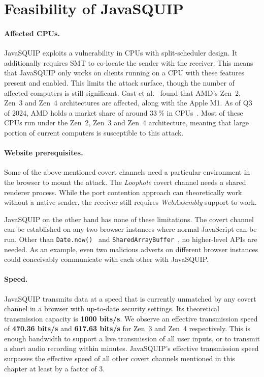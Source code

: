\documentclass[11pt,
  titlepage=false,
  parskip=half,      %
]{scrreprt}
\begin{document}
\section{Feasibility of JavaSQUIP}

\paragraph{Affected CPUs.}
JavaSQUIP exploits a vulnerability in CPUs with split-scheduler design.
It additionally requires SMT to co-locate the sender with the receiver.
This means that JavaSQUIP only works on clients running on a CPU with these features present and enabled.
This limits the attack surface, though the number of affected computers is still significant.
Gast et al.~\cite{squip} found that AMD's Zen~2, Zen~3 and Zen~4 architectures are affected, along with the Apple M1.
As of Q3 of 2024, AMD holds a market share of around $33~\%$ in CPUs~\cite{amdmarket}.
Most of these CPUs run under the Zen~2, Zen~3 and Zen~4 architecture,
meaning that large portion of current computers is susceptible to this attack.

\paragraph{Website prerequisites.}
Some of the above-mentioned covert channels need a particular environment in the browser to mount the attack.
The \textit{Loophole} covert channel needs a shared renderer process.
While the port contention approach can theoretically work without a native sender,
the receiver still requires \textit{WebAssembly} support to work.

JavaSQUIP on the other hand has none of these limitations.
The covert channel can be established on any two browser instances where normal JavaScript can be run.
Other than \texttt{Date.now()}~\cite{datenow} and \texttt{SharedArrayBuffer}~\cite{sharedarraybuffer},
no higher-level APIs are needed.
As an example, even two malicious adverts on different browser instances could conceivably communicate with each other
with JavaSQUIP.

\paragraph{Speed.}
JavaSQUIP transmits data at a speed that is currently unmatched by any covert channel in a browser with up-to-date security settings.
Its theoretical transmission capacity is \textbf{1000 bits/s}.
We observe an effective transmission speed of \textbf{470.36 bits/s} and \textbf{617.63 bits/s} for Zen~3 and Zen~4 respectively.
This is enough bandwidth to support a live transmission of all user inputs, or to transmit a short audio recording within minutes.
JavaSQUIP's effective transmission speed surpasses the effective speed of all other covert channels mentioned in this chapter at least by a factor of 3.
\end{document}
